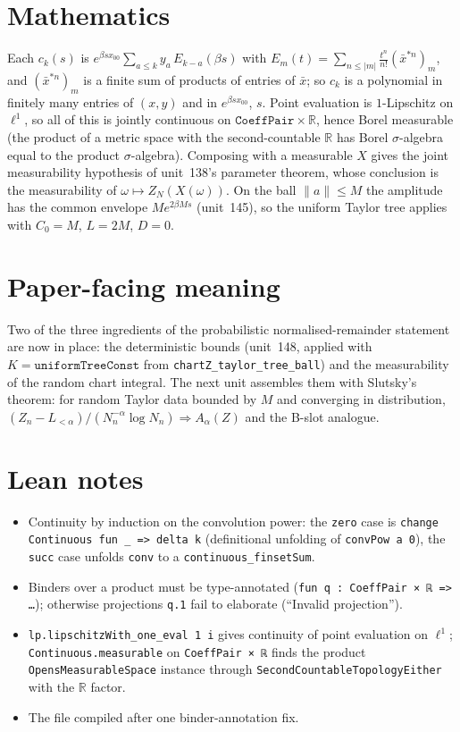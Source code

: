 \documentclass[11pt]{article}
\begin{document}
\section{Mathematics}
Each $c_k(s)$ is $e^{\beta sx_{00}}\sum_{a\le k}y_a\,E_{k-a}(\beta s)$ with
$E_m(t)=\sum_{n\le|m|}\frac{t^n}{n!}(\bar x^{*n})_m$, and $(\bar x^{*n})_m$ is a finite sum of
products of entries of $\bar x$; so $c_k$ is a polynomial in finitely many entries of $(x,y)$ and in
$e^{\beta sx_{00}}$, $s$. Point evaluation is $1$-Lipschitz on $\ell^1$, so all of this is jointly
continuous on $\texttt{CoeffPair}\times\mathbb R$, hence Borel measurable (the product of a metric
space with the second-countable $\mathbb R$ has Borel $\sigma$-algebra equal to the product
$\sigma$-algebra). Composing with a measurable $X$ gives the joint measurability hypothesis of
unit~138's parameter theorem, whose conclusion is the measurability of $\omega\mapsto Z_N(X(\omega))$.
On the ball $\|a\|\le M$ the amplitude has the common envelope $Me^{2\beta Ms}$ (unit~145), so the
uniform Taylor tree applies with $C_0=M$, $L=2M$, $D=0$.

\section{Paper-facing meaning}
Two of the three ingredients of the probabilistic normalised-remainder statement are now in place:
the deterministic bounds (unit~148, applied with $K=\texttt{uniformTreeConst}$ from
\texttt{chartZ\_taylor\_tree\_ball}) and the measurability of the random chart integral. The next
unit assembles them with Slutsky's theorem: for random Taylor data bounded by $M$ and converging in
distribution, $(Z_n-L_{<\alpha})/(N_n^{-\alpha}\log N_n)\Rightarrow A_\alpha(Z)$ and the B-slot
analogue.

\section{Lean notes}
\begin{itemize}
\item Continuity by induction on the convolution power: the \texttt{zero} case is
\texttt{change Continuous fun \_ => delta k} (definitional unfolding of \texttt{convPow a 0}),
the \texttt{succ} case unfolds \texttt{conv} to a \texttt{continuous\_finsetSum}.
\item Binders over a product must be type-annotated (\texttt{fun q : CoeffPair × ℝ => …});
otherwise projections \texttt{q.1} fail to elaborate (``Invalid projection'').
\item \texttt{lp.lipschitzWith\_one\_eval 1 i} gives continuity of point evaluation on $\ell^1$;
\texttt{Continuous.measurable} on \texttt{CoeffPair × ℝ} finds the product
\texttt{OpensMeasurableSpace} instance through \texttt{SecondCountableTopologyEither} with the
$\mathbb R$ factor.
\item The file compiled after one binder-annotation fix.
\end{itemize}
\end{document}
